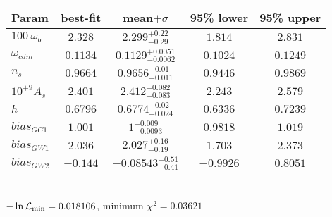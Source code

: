 \begin{tabular}{|l|c|c|c|c|} 
 \hline 
Param & best-fit & mean$\pm\sigma$ & 95\% lower & 95\% upper \\ \hline 
$100~\omega_{b }$ &$2.328$ & $2.299_{-0.29}^{+0.22}$ & $1.814$ & $2.831$ \\ 
$\omega_{cdm }$ &$0.1134$ & $0.1129_{-0.0062}^{+0.0051}$ & $0.1024$ & $0.1249$ \\ 
$n_{s }$ &$0.9664$ & $0.9656_{-0.011}^{+0.01}$ & $0.9446$ & $0.9869$ \\ 
$10^{+9}A_{s }$ &$2.401$ & $2.412_{-0.083}^{+0.082}$ & $2.243$ & $2.579$ \\ 
$h$ &$0.6796$ & $0.6774_{-0.024}^{+0.02}$ & $0.6336$ & $0.7239$ \\ 
$bias_{GC 1 }$ &$1.001$ & $1_{-0.0093}^{+0.009}$ & $0.9818$ & $1.019$ \\ 
$bias_{GW 1 }$ &$2.036$ & $2.027_{-0.19}^{+0.16}$ & $1.703$ & $2.373$ \\ 
$bias_{GW 2 }$ &$-0.144$ & $-0.08543_{-0.41}^{+0.51}$ & $-0.9926$ & $0.8051$ \\ 
\hline 
 \end{tabular} \\ 
$-\ln{\cal L}_\mathrm{min} =0.018106$, minimum $\chi^2=0.03621$ \\ 
